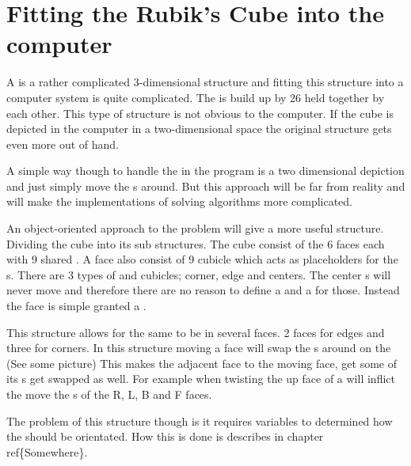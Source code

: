\chapter{Fitting the Rubik's Cube into the computer}
A \rubik{} is a rather complicated 3-dimensional structure and fitting this structure into a computer system is quite complicated. 
The \rubik{} is build up by 26 \cpieces{} held together by each other. 
This type of structure is not obvious to the computer. If the cube is depicted in the computer in a two-dimensional space the original \rubik{} structure gets even more out of hand. 

A simple way though to handle the \rubik{} in the program is a two dimensional depiction and  just simply move the \facelet{}s around.
But this approach will be far from reality and will make the implementations of solving algorithms more complicated.

An object-oriented approach to the problem will give a more useful structure. 
Dividing the cube into its sub structures. 
The cube consist of the 6 faces each with 9 shared \cpiece{}. 
A face also consist of 9 cubicle which acts as placeholders for the \cpiece{}s. 
There are 3 types of \cpiece{} and cubicles; corner, edge and centers. 
The center \cpiece{}s will never move and therefore there are no reason to define a \cubicle{} and a \cipeice{} for those. Instead the face is simple granted a \facelet{}.

This structure allows for the same \cubicle{} to be in several faces. 
2 faces for edges and three for corners. 
In this structure moving a face will swap the \cpiece{}s around on the \cubicle{}(See some picture) This makes the adjacent face to the moving face, get some of its \cpiece{}s get swapped as well. 
For example when twisting the up face of a \rubik{} will inflict the move the \cpiece{}s of the R, L, B and F faces. 

The problem of this structure though is it requires variables to determined how the \facelet{} should be orientated. 
How this is done is describes in chapter ref\{Somewhere\}.
